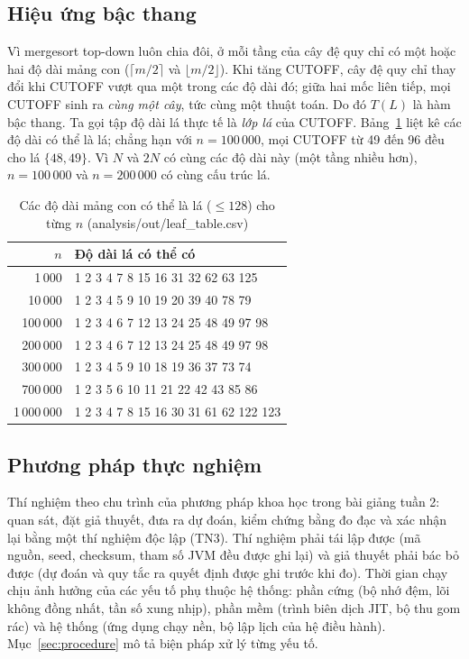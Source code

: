 \documentclass[11pt,a4paper]{article}
\begin{document}
\subsection{Hiệu ứng bậc thang}
Vì mergesort top-down luôn chia đôi, ở mỗi tầng của cây đệ quy chỉ có một hoặc hai độ dài mảng con
($\lceil m/2 \rceil$ và $\lfloor m/2 \rfloor$). Khi tăng CUTOFF, cây đệ quy chỉ thay đổi khi CUTOFF vượt qua
một trong các độ dài đó; giữa hai mốc liên tiếp, mọi CUTOFF sinh ra \emph{cùng một cây}, tức cùng một
thuật toán. Do đó $T(L)$ là hàm bậc thang. Ta gọi tập độ dài lá thực tế là \emph{lớp lá} của CUTOFF.
Bảng~\ref{tab:leaf} liệt kê các độ dài có thể là lá; chẳng hạn với $n=100\,000$, mọi CUTOFF từ 49 đến 96
đều cho lá $\{48,49\}$. Vì $N$ và $2N$ có cùng các độ dài này (một tầng nhiều hơn),
$n=100\,000$ và $n=200\,000$ có cùng cấu trúc lá.

\begin{table}[H]
\centering
\small
\setlength{\tabcolsep}{4pt}
\begin{tabular}{rl}
\toprule
$n$ & Độ dài lá có thể có \\
\midrule
1\,000 & 1 2 3 4 7 8 15 16 31 32 62 63 125 \\
10\,000 & 1 2 3 4 5 9 10 19 20 39 40 78 79 \\
100\,000 & 1 2 3 4 6 7 12 13 24 25 48 49 97 98 \\
200\,000 & 1 2 3 4 6 7 12 13 24 25 48 49 97 98 \\
300\,000 & 1 2 3 4 5 9 10 18 19 36 37 73 74 \\
700\,000 & 1 2 3 5 6 10 11 21 22 42 43 85 86 \\
1\,000\,000 & 1 2 3 4 7 8 15 16 30 31 61 62 122 123 \\
\bottomrule
\end{tabular}
\caption{Các độ dài mảng con có thể là lá ($\le 128$) cho từng $n$ (analysis/out/leaf\_table.csv)}
\label{tab:leaf}
\end{table}

\subsection{Phương pháp thực nghiệm}
Thí nghiệm theo chu trình của phương pháp khoa học trong bài giảng tuần 2: quan sát,
đặt giả thuyết, đưa ra dự đoán, kiểm chứng bằng đo đạc và xác nhận lại bằng một thí nghiệm độc lập (TN3).
Thí nghiệm phải tái lập được (mã nguồn, seed, checksum, tham số JVM đều được ghi lại) và giả thuyết phải
bác bỏ được (dự đoán và quy tắc ra quyết định được ghi trước khi đo).
Thời gian chạy chịu ảnh hưởng của các yếu tố phụ thuộc hệ thống: phần cứng (bộ nhớ đệm, lõi không đồng nhất,
tần số xung nhịp), phần mềm (trình biên dịch JIT, bộ thu gom rác) và hệ thống (ứng dụng chạy nền, bộ lập lịch
của hệ điều hành). Mục~\ref{sec:procedure} mô tả biện pháp xử lý từng yếu tố.
\end{document}
